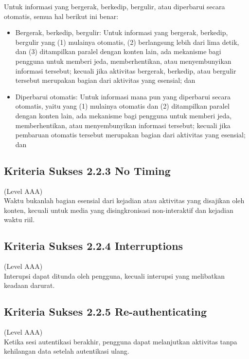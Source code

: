Untuk informasi yang bergerak, berkedip, bergulir, atau diperbarui secara otomatis, semua hal berikut ini benar:

\begin{itemize}
	\item Bergerak, berkedip, bergulir: Untuk informasi yang bergerak, berkedip, bergulir yang (1) mulainya otomatis, (2) berlangsung lebih dari lima detik, dan (3) ditampilkan paralel dengan konten lain, ada mekanisme bagi pengguna untuk memberi jeda, memberhentikan, atau menyembunyikan informasi tersebut; kecuali jika aktivitas bergerak, berkedip, atau bergulir tersebut merupakan bagian dari aktivitas yang esensial; dan
	\item Diperbarui otomatis: Untuk informasi mana pun yang diperbarui secara otomatis, yaitu yang (1) mulainya otomatis dan (2) ditampilkan paralel dengan konten lain, ada mekanisme bagi pengguna untuk memberi jeda, memberhentikan, atau menyembunyikan informasi tersebut; kecuali jika pembaruan otomatis tersebut merupakan bagian dari aktivitas yang esensial; dan
\end{itemize}

\subsection{Kriteria Sukses 2.2.3 No Timing}
\label{subsec:kriteria_2.2.3}
(Level AAA) \\

Waktu bukanlah bagian esensial dari kejadian atau aktivitas yang disajikan oleh konten, kecuali untuk media yang disingkronisasi non-interaktif dan kejadian waktu riil.

\subsection{Kriteria Sukses 2.2.4 Interruptions}
\label{subsec:kriteria_2.2.4}
(Level AAA) \\

Interupsi dapat ditunda oleh pengguna, kecuali interupsi yang melibatkan keadaan darurat.

\subsection{Kriteria Sukses 2.2.5 Re-authenticating}
\label{subsec:kriteria_2.2.5}
(Level AAA) \\

Ketika sesi autentikasi berakhir, pengguna dapat melanjutkan aktivitas tanpa kehilangan data setelah autentikasi ulang.


